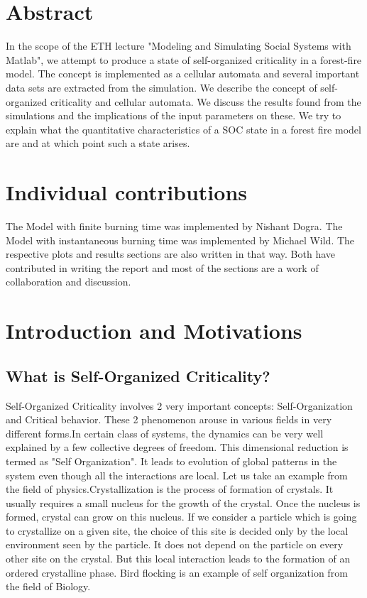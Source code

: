 \documentclass[11pt]{article}
\begin{document}



\section{Abstract}
In the scope of the ETH lecture "Modeling and Simulating Social Systems with Matlab", we attempt to produce a state of self-organized criticality in a forest-fire model. The concept is implemented as a cellular automata and several important data sets are extracted from the simulation. We describe the concept of self-organized criticality and cellular automata. We discuss the results found from the simulations and the implications of the input parameters on these. We try to explain what the quantitative characteristics of a SOC state in a forest fire model are and at which point such a state arises. 

\section{Individual contributions}
The Model with finite burning time was implemented by Nishant Dogra.
The Model with instantaneous burning time was implemented by Michael Wild.
The respective plots and results sections are also written in that way.
Both have contributed in writing the report and most of the sections are a work of collaboration and discussion.


\section{Introduction and Motivations}
\subsection{What is Self-Organized Criticality?}
Self-Organized Criticality involves 2 very important concepts: Self-Organization and Critical behavior\cite{ref3}. These 2 phenomenon arouse in various fields in very different forms.In certain class of systems, the dynamics can be very well explained by a few collective degrees of freedom. This dimensional reduction is termed as "Self Organization". It leads to evolution of global patterns in the system even though all the interactions are local. Let us take an example from the field of physics.Crystallization is the process of formation of crystals. It usually requires a small nucleus for the growth of the crystal. Once the nucleus is formed, crystal can grow on this nucleus. If we consider a particle which is going to crystallize on a given site, the choice of this site is decided only by the local environment seen by the particle. It does not depend on the particle on every other site on the crystal. But this local interaction leads to the formation of an ordered crystalline phase. Bird flocking is an example of self organization from the field of Biology.
\end{document}
